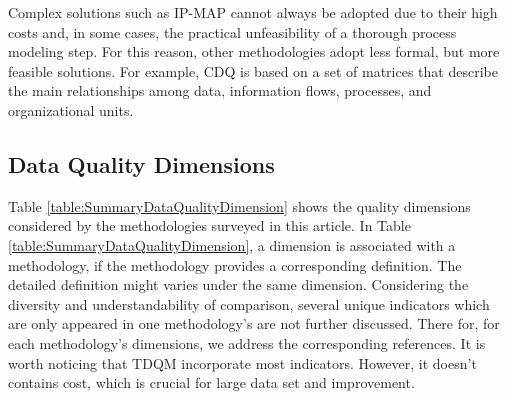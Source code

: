 \documentclass[pdftex,english,oribibl]{llncs}
\begin{document}
Complex solutions such as IP-MAP cannot always be adopted due to their high costs and, in some cases, the practical unfeasibility of a thorough process modeling step.
For this reason, other methodologies adopt less formal, but more feasible solutions.
For example, CDQ is based on a set of matrices that describe the main relationships among data, information flows, processes, and organizational units.
\begin{comment}
The relationship between organizational units and processes has also been modeled in extensions of IP-MAP proposed in the literature [Scannapieco et al. 2002].
\end{comment}

\subsection{Data Quality Dimensions}
Table \ref{table:SummaryDataQualityDimension} shows the quality dimensions considered by the methodologies surveyed in this article.
In Table \ref{table:SummaryDataQualityDimension}, a dimension is associated with a methodology, if the methodology provides a corresponding definition.
The detailed definition might varies under the same dimension. Considering the diversity and understandability of comparison, several unique indicators which are only appeared in one methodology's are not further discussed. There for, for each methodology’s dimensions, we address the corresponding references. It is worth noticing that TDQM incorporate most indicators. However, it doesn't contains cost, which is crucial for large data set and improvement.
\end{document}
